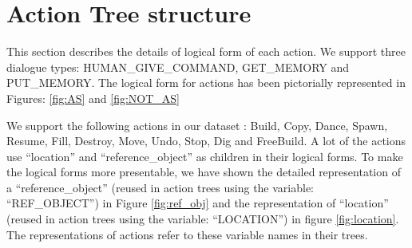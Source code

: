 \clearpage
\onecolumn

\section{Action Tree structure}
\label{sec:action_tree}

This section describes the details of logical form of each action.
We support three dialogue types: HUMAN\_GIVE\_COMMAND, GET\_MEMORY and PUT\_MEMORY.
The logical form for actions has been pictorially represented in Figures: \ref{fig:AS} and \ref{fig:NOT_AS}

We support the following actions in our dataset : Build, Copy, Dance, Spawn, Resume, Fill, Destroy, Move, Undo, Stop, Dig and FreeBuild.
A lot of the actions use  ``location'' and ``reference\_object'' as children in their logical forms. To make the logical forms more presentable, we have shown the detailed representation of a ``reference\_object'' (reused in action trees using the variable: ``REF\_OBJECT'') in Figure \ref{fig:ref_obj} and the representation of ``location'' (reused in action trees using the variable: ``LOCATION'') in figure \ref{fig:location}. The representations of actions refer to these variable names in their trees.


